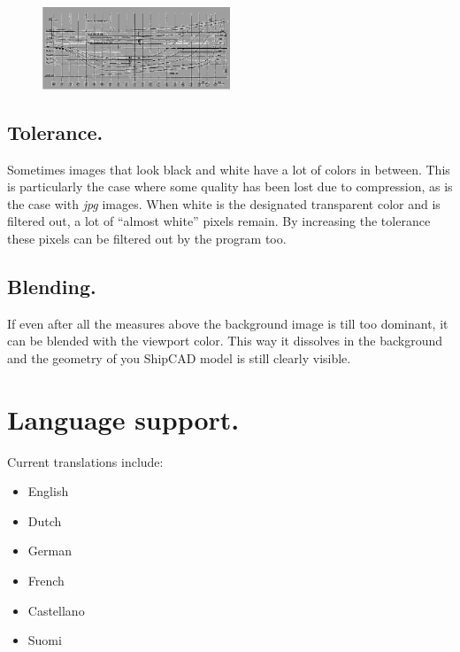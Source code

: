 \documentclass[12pt]{article}
\begin{document}
\begin{figure}
        \centering
        \includegraphics[width=0.5\textwidth,natwidth=578,natheight=253]{backgroundimage-3.png}
        \caption{}
        \label{fig:backgroundimage3}
\end{figure}

\subsection{Tolerance.}
Sometimes images that look black and white
have a lot of colors in between. This is
particularly the case where some quality has
been lost due to compression, as is the case
with \textit{jpg} images. When white is the designated
transparent color and is filtered out, a lot of
``almost white'' pixels remain. By increasing the
tolerance these pixels can be filtered out by the
program too.

\subsection{Blending.}
If even after all the measures above the background image is till too
dominant, it can be blended with the viewport color. This way it
dissolves in the background and the geometry of you ShipCAD model is
still clearly visible.

\pagebreak

\section{Language support.} \label{language-support}
Current translations include:

\begin{itemize}

\item English

\item Dutch

\item German

\item French

\item Castellano

\item Suomi

\end{itemize}
\end{document}
